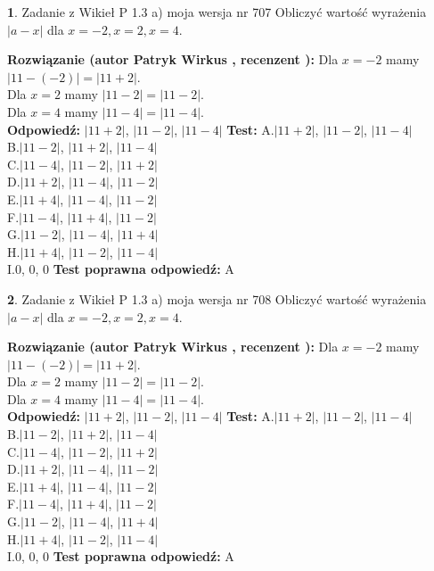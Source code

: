 \documentclass[12pt, a4paper]{article}
\theoremstyle{definition} %
\newtheorem{zad}{}
\newcommand{\zadStart}[1]{\begin{zad}#1\newline}
\newcommand{\zadStop}{\end{zad}}
\newcommand{\rozwStart}[2]{\noindent \textbf{Rozwiązanie (autor #1 , recenzent #2): }\newline}
\newcommand{\rozwStop}{\newline}
\newcommand{\odpStart}{\noindent \textbf{Odpowiedź:}\newline}
\newcommand{\odpStop}{\newline}
\newcommand{\testStart}{\noindent \textbf{Test:}\newline}
\newcommand{\testStop}{\newline}
\newcommand{\kluczStart}{\noindent \textbf{Test poprawna odpowiedź:}\newline}
\newcommand{\kluczStop}{\newline}
\begin{document}
\zadStart{Zadanie z Wikieł P 1.3 a) moja wersja nr 707}
Obliczyć wartość wyrażenia $|a - x|$ dla $x=-2,x=2,x=4$.
\zadStop
\rozwStart{Patryk Wirkus}{}
Dla $x = -2$ mamy $|11 - (-2)| = |11 + 2|$.\\
Dla $x = 2$ mamy $|11 - 2| = |11 - 2|$.\\
Dla $x = 4$ mamy $|11 - 4| = |11 - 4|$.\\
\rozwStop
\odpStart
$|11 + 2|$, $|11 - 2|$, $|11 - 4|$
\odpStop
\testStart
A.$|11 + 2|$, $|11 - 2|$, $|11 - 4|$\\
B.$|11 - 2|$, $|11 + 2|$, $|11 - 4|$\\
C.$|11 - 4|$, $|11 - 2|$, $|11 + 2|$\\
D.$|11 + 2|$, $|11 - 4|$, $|11 - 2|$\\
E.$|11 + 4|$, $|11 - 4|$, $|11 - 2|$\\
F.$|11 - 4|$, $|11 + 4|$, $|11 - 2|$\\
G.$|11 - 2|$, $|11 - 4|$, $|11 + 4|$\\
H.$|11 + 4|$, $|11 - 2|$, $|11 - 4|$\\
I.$0$, $0$, $0$
\testStop
\kluczStart
A
\kluczStop



\zadStart{Zadanie z Wikieł P 1.3 a) moja wersja nr 708}
Obliczyć wartość wyrażenia $|a - x|$ dla $x=-2,x=2,x=4$.
\zadStop
\rozwStart{Patryk Wirkus}{}
Dla $x = -2$ mamy $|11 - (-2)| = |11 + 2|$.\\
Dla $x = 2$ mamy $|11 - 2| = |11 - 2|$.\\
Dla $x = 4$ mamy $|11 - 4| = |11 - 4|$.\\
\rozwStop
\odpStart
$|11 + 2|$, $|11 - 2|$, $|11 - 4|$
\odpStop
\testStart
A.$|11 + 2|$, $|11 - 2|$, $|11 - 4|$\\
B.$|11 - 2|$, $|11 + 2|$, $|11 - 4|$\\
C.$|11 - 4|$, $|11 - 2|$, $|11 + 2|$\\
D.$|11 + 2|$, $|11 - 4|$, $|11 - 2|$\\
E.$|11 + 4|$, $|11 - 4|$, $|11 - 2|$\\
F.$|11 - 4|$, $|11 + 4|$, $|11 - 2|$\\
G.$|11 - 2|$, $|11 - 4|$, $|11 + 4|$\\
H.$|11 + 4|$, $|11 - 2|$, $|11 - 4|$\\
I.$0$, $0$, $0$
\testStop
\kluczStart
A
\kluczStop
\end{document}
